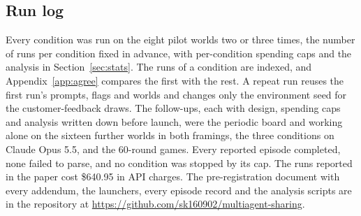 \begin{table}[H]
  \centering
  \caption{Number of sharing conditions (of eight) whose repeat runs fall on the same side of working alone as the first run.}
  \label{tab:agree}
  \small
  
\end{table}

\subsection{Run log}\label{app:runs}

Every condition was run on the eight pilot worlds two or three times, the number of runs per condition fixed in
advance, with per-condition spending caps and the analysis in Section~\ref{sec:stats}. The runs of a condition are
indexed, and Appendix~\ref{app:agree} compares the first with the rest. A repeat run reuses the first run's
prompts, flags and worlds and changes only the environment seed for the customer-feedback draws. The follow-ups,
each with design, spending caps and analysis written down before launch, were the periodic board and working alone
on the sixteen further worlds in both framings, the three conditions on Claude Opus 5.5, and the 60-round games.
Every reported episode completed, none failed to parse, and no condition was stopped by its cap. The runs reported
in the paper cost \$640.95 in API charges. The pre-registration document with every addendum, the launchers, every
episode record and the analysis scripts
are in the repository at \url{https://github.com/sk160902/multiagent-sharing}.
